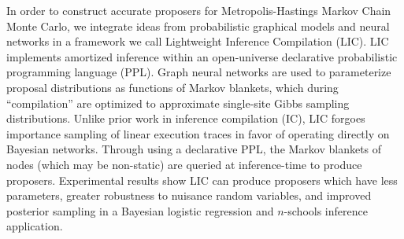 \documentclass[thesis.tex]{subfiles}
\begin{document}
%

%




  In order to construct accurate proposers for Metropolis-Hastings Markov
  Chain Monte Carlo, we integrate ideas from probabilistic graphical models
  and neural networks in a framework we call Lightweight
  Inference Compilation (LIC). LIC implements amortized inference within an
  open-universe declarative probabilistic programming language (PPL).
  Graph neural networks are used to parameterize proposal distributions
  as functions of Markov blankets, which during ``compilation'' are optimized
  to approximate single-site Gibbs sampling distributions. Unlike prior work
  in inference compilation (IC), LIC forgoes importance sampling of linear
  execution traces in favor of operating directly on Bayesian networks.
  Through using a declarative PPL, the Markov blankets of nodes (which may be
  non-static) are queried at inference-time to produce proposers. Experimental
  results show LIC can produce proposers which have less parameters, greater
  robustness to nuisance random variables, and improved posterior sampling in
  a Bayesian logistic regression and $n$-schools inference application.
\end{document}
